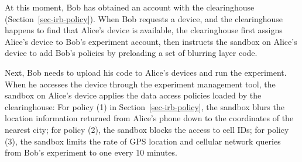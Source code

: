 At this moment,  Bob has obtained an account with the clearinghouse 
(Section~\ref{sec-irb-policy}).
When Bob requests a device, and the clearinghouse
happens to find that Alice's device is available, the
clearinghouse first 
assigns Alice's device to Bob's experiment account, then instructs 
the sandbox on Alice's device to add Bob's policies by preloading
a set of blurring layer code.

Next, Bob needs to upload his code to Alice's devices and 
run the experiment. When he accesses the device through
the experiment management tool, the sandbox on Alice's device 
applies the data access policies loaded by the clearinghouse: For policy (1) in
Section~\ref{sec-irb-policy}, the sandbox blurs the location
information returned from Alice's phone down to the coordinates
of the nearest city; for policy (2), the sandbox blocks the
access to cell IDs; for policy (3), the sandbox limits the rate
of GPS location and cellular network queries from Bob's
experiment to one every 10 minutes.

